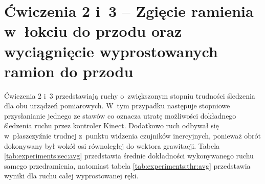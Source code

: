\section*{Ćwiczenia 2 i~3 -- Zgięcie ramienia w~łokciu do przodu oraz wyciągnięcie wyprostowanych ramion do przodu}
Ćwiczenia 2 i~3 przedstawiają ruchy o~zwiększonym stopniu trudności śledzenia dla obu urządzeń pomiarowych. W~tym przypadku następuje stopniowe przysłanianie jednego ze stawów co oznacza utratę możliwości dokładnego śledzenia ruchu przez kontroler Kinect. Dodatkowo ruch odbywał się w~płaszczyźnie trudnej z~punktu widzenia czujników inercyjnych, ponieważ obrót dokonywany był wokół osi równoległej do wektora grawitacji. Tabela \ref{tab:experiments:sec:avg} przedstawia średnie dokładności wykonywanego ruchu samego przedramienia, natomiast tabela \ref{tab:experiments:thr:avg} przedstawia wyniki dla ruchu całej wyprostowanej ręki.
														

